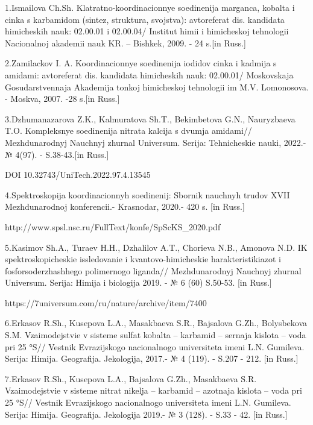 \begin{noparindent}
1.Ismailova Ch.Sh. Klatratno-koordinacionnye soedinenija marganca,
kobal\textquotesingle ta i cinka s karbamidom (sintez, struktura,
svojstva): avtoreferat dis. kandidata himicheskih nauk: 02.00.01 i
02.00.04/ Institut himii i himicheskoj tehnologii
Nacional\textquotesingle noj akademii nauk KR. -- Bishkek, 2009. - 24
s.{[}in Russ.{]}

2.Zamilackov I. A. Koordinacionnye soedinenija iodidov cinka i kadmija s
amidami: avtoreferat dis. kandidata himicheskih nauk: 02.00.01/
Moskovskaja Gosudarstvennaja Akademija tonkoj himicheskoj tehnologii im
M.V. Lomonosova. - Moskva, 2007. -28 s.{[}in Russ.{]}

3.Dzhumanazarova Z.K., Kalmuratova Sh.T., Bekimbetova G.N., Nauryzbaeva
T.O. Kompleksnye soedinenija nitrata kal\textquotesingle cija s dvumja
amidami// Mezhdunarodnyj Nauchnyj zhurnal Universum. Serija:
Tehnicheskie nauki, 2022.-№ 4(97). - S.38-43.{[}in Russ.{]}

DOI 10.32743/UniTech.2022.97.4.13545

4.Spektroskopija koordinacionnyh soedinenij: Sbornik nauchnyh trudov
XVII Mezhdunarodnoj konferencii.- Krasnodar, 2020.- 420 s. {[}in
Russ.{]}

http://www.spsl.nsc.ru/FullText/konfe/SpScKS\_2020.pdf

5.Kasimov Sh.A., Turaev H.H., Dzhalilov A.T., Chorieva N.B., Amonova
N.D. IK spektroskopicheskie issledovanie i kvantovo-himicheskie
harakteristikiazot i fosforsoderzhashhego polimernogo liganda//
Mezhdunarodnyj Nauchnyj zhurnal Universum. Serija: Himija i biologija
2019. - № 6 (60) S.50-53. {[}in Russ.{]}

https://7universum.com/ru/nature/archive/item/7400

6.Erkasov R.Sh., Kusepova L.A., Masakbaeva S.R., Bajsalova G.Zh.,
Bolysbekova S.M. Vzaimodejstvie v sisteme sul\textquotesingle fat
kobal\textquotesingle ta -- karbamid -- sernaja kislota -- voda pri 25
°S// Vestnik Evrazijskogo nacional\textquotesingle nogo universiteta
imeni L.N. Gumileva. Serija: Himija. Geografija. Jekologija, 2017.- № 4
(119). - S.207 - 212. {[}in Russ.{]}

7.Erkasov R.Sh., Kusepova L.A., Bajsalova G.Zh., Masakbaeva S.R.
Vzaimodejstvie v sisteme nitrat nikelja -- karbamid -- azotnaja kislota
-- voda pri 25 °S// Vestnik Evrazijskogo nacional\textquotesingle nogo
universiteta imeni L.N. Gumileva. Serija: Himija. Geografija. Jekologija
2019.- № 3 (128). - S.33 - 42. {[}in Russ.{]}


\end{noparindent}
